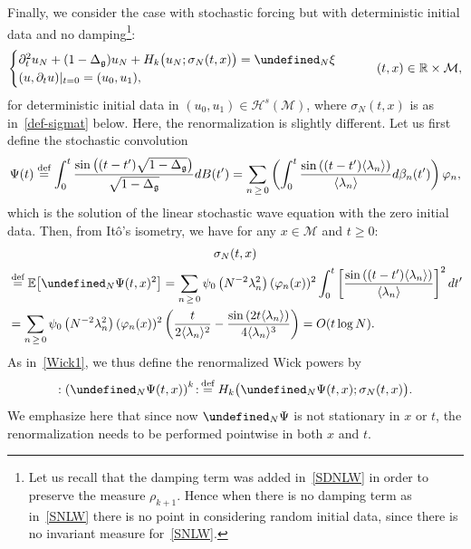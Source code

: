 \documentclass[10pt]{amsart}
\theoremstyle{definition}\newtheorem{defi}[theo]{Definition}\newtheorem{rema}[theo]{Remark}\newtheorem{exam}[theo]{Example}\newtheorem{exem}[theo]{Example}\newtheorem{nota}[theo]{Notation}
\newcommand{\R}{\mathbb{R}}
\newcommand{\E}{\mathbb{E}}
\newcommand{\deff}{\overset{\textup{def}}{=}}
\let\P= \undefined
\newcommand{\P}{\mathbf{P}}
\newcommand{\M}{\mathcal{M}}
\renewcommand{\H}{\mathcal{H}}
\newcommand{\g}{\mathfrak{g}}
\newcommand{\Dlg}{\Delta_{\g}}
\newcommand{\s}{\sigma}
\newcommand{\dt}{\partial_t}
\newcommand{\jb}[1] {\langle #1 \rangle}
\begin{document}
Finally, we consider the case with stochastic forcing but with deterministic initial data and no damping\footnote{Let us recall that the damping term was added in~\eqref{SDNLW} in order to preserve the measure $\rho_{k+1}$. Hence when there is no damping term as in~\eqref{SNLW} there is no point in considering random initial data, since there is no invariant measure for~\eqref{SNLW}.}:
\begin{equation}\label{trunc-SNLW}
\begin{cases}
\dt^2 u_N +(1- \Dlg) u_N + H_k \big(u_N;\s_N(t,x)\big) = \P_N\xi \\
(u, \dt u) |_{t = 0} = (u_0, u_1),
\end{cases}
\qquad (t,x) \in \R \times \M,
\end{equation}
for deterministic initial data in $(u_0,u_1)\in\H^s(\M)$, where $\s_N(t,x)$ is as in~\eqref{def-sigmat} below. Here, the renormalization is slightly different. Let us first define the stochastic convolution
\begin{equation*}
\Psi(t)
\deff\int_0^t\frac{\sin\left((t-t')\sqrt{1-\Dlg}\right)}{\sqrt{1-\Dlg}}dB(t') = \sum_{n\,\geq\,0}\left(\int_0^t\frac{\sin\left((t-t')\jb{\lambda_n}\right)}{\jb{\lambda_n}}d\beta_n(t')\right)\varphi_n,
\end{equation*}
which is the solution of the linear stochastic wave equation with the zero initial data. Then, from Itô's isometry, we have for any $x\in\M$ and $t\geq 0$:
\begin{multline}\label{def-sigmat}
\s_N(t,x)\\
\begin{aligned}
&\deff \E\big[\P_N\Psi(t,x)^2\big]=\sum_{n\,\geq\,0}\psi_0\left(N^{-2}\lambda_n^2\right)(\varphi_n(x))^2\int_0^t \left[\frac{\sin\left((t-t')\jb{\lambda_n}\right)}{\jb{\lambda_n}}\right]^2dt'\\
&=\sum_{n\,\geq\,0}\psi_0\left(N^{-2}\lambda_n^2\right)(\varphi_n(x))^2\left(\frac{t}{2\jb{\lambda_n}^2}-\frac{\sin\left(2t\jb{\lambda_n}\right)}{4\jb{\lambda_n}^3}\right) =O(t\log N).
\end{aligned}
\end{multline}
As in~\eqref{Wick1}, we thus define the renormalized Wick powers by
\begin{equation}\label{def-WickPsi}
:\left(\P_N\Psi(t,x)\right)^k\!:\, \deff H_k\big(\P_N\Psi(t,x);\s_N(t,x)\big).
\end{equation}
We emphasize here that since now $\P_N\Psi$ is not stationary in $x$ or $t$, the renormalization needs to be performed pointwise in both $x$ and $t$.
\end{document}
